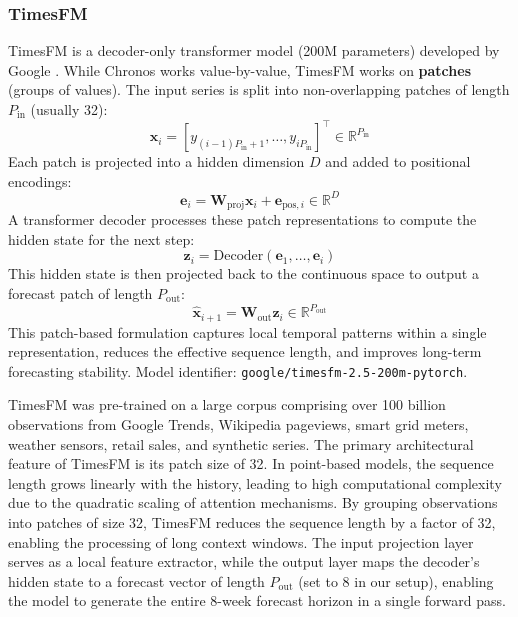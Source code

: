 \subsubsection{TimesFM}
TimesFM is a decoder-only transformer model (200M parameters) developed by Google \cite{timesfm}. While Chronos works value-by-value, TimesFM works on \textbf{patches} (groups of values). The input series is split into non-overlapping patches of length $P_{\text{in}}$ (usually 32):
\begin{equation}
\mathbf{x}_i = [y_{(i-1)P_{\text{in}} + 1}, \dots, y_{i P_{\text{in}}}]^\top \in \mathbb{R}^{P_{\text{in}}}
\end{equation}
Each patch is projected into a hidden dimension $D$ and added to positional encodings:
\begin{equation}
\mathbf{e}_i = \mathbf{W}_{\text{proj}} \mathbf{x}_i + \mathbf{e}_{\text{pos}, i} \in \mathbb{R}^D
\end{equation}
A transformer decoder processes these patch representations to compute the hidden state for the next step:
\begin{equation}
\mathbf{z}_i = \text{Decoder}(\mathbf{e}_1, \dots, \mathbf{e}_i)
\end{equation}
This hidden state is then projected back to the continuous space to output a forecast patch of length $P_{\text{out}}$:
\begin{equation}
\hat{\mathbf{x}}_{i+1} = \mathbf{W}_{\text{out}} \mathbf{z}_i \in \mathbb{R}^{P_{\text{out}}}
\end{equation}
This patch-based formulation captures local temporal patterns within a single representation, reduces the effective sequence length, and improves long-term forecasting stability. Model identifier: \texttt{google/timesfm-2.5-200m-pytorch}.

TimesFM was pre-trained on a large corpus comprising over 100 billion observations from Google Trends, Wikipedia pageviews, smart grid meters, weather sensors, retail sales, and synthetic series. The primary architectural feature of TimesFM is its patch size of 32. In point-based models, the sequence length grows linearly with the history, leading to high computational complexity due to the quadratic scaling of attention mechanisms. By grouping observations into patches of size 32, TimesFM reduces the sequence length by a factor of 32, enabling the processing of long context windows. The input projection layer serves as a local feature extractor, while the output layer maps the decoder's hidden state to a forecast vector of length $P_{\text{out}}$ (set to 8 in our setup), enabling the model to generate the entire $8$-week forecast horizon in a single forward pass.

